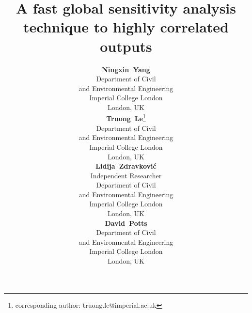 \title{A fast global sensitivity analysis technique to highly correlated outputs}

\author{
 \textbf{Ningxin~Yang}\\
Department of Civil \\ and Environmental Engineering \\ Imperial College London\\  London, UK\\
 	\And
	\textbf{Truong~Le}\thanks{corresponding author: truong.le@imperial.ac.uk}\\
Department of Civil \\ and Environmental Engineering \\ Imperial College London\\  London, UK\\ 
 \And
 \textbf{Lidija~Zdravković} \\
	Independent Researcher\\
Department of Civil \\ and Environmental Engineering \\ Imperial College London\\  London, UK\\
	\And
 \textbf{David~Potts} \\
Department of Civil \\ and Environmental Engineering \\ Imperial College London\\  London, UK
}

\renewcommand{\shorttitle}{}